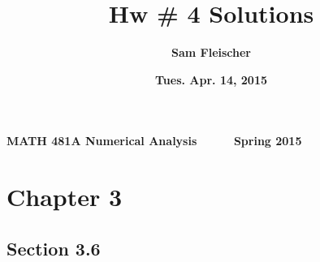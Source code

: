 \documentclass[12pt]{article}
\begin{document}
{\bf MATH 481A \hfill Numerical Analysis \ \ \ \ \ \hfill Spring 2015}

\title{\bf Hw \# 4 Solutions}
\author{\bf Sam Fleischer}
\date{\bf Tues. Apr. 14, 2015}

{\let\newpage\relax\maketitle}
\maketitle
\tableofcontents
\pagebreak

\section*{Chapter 3}

\subsection*{Section 3.6}
\end{document}
